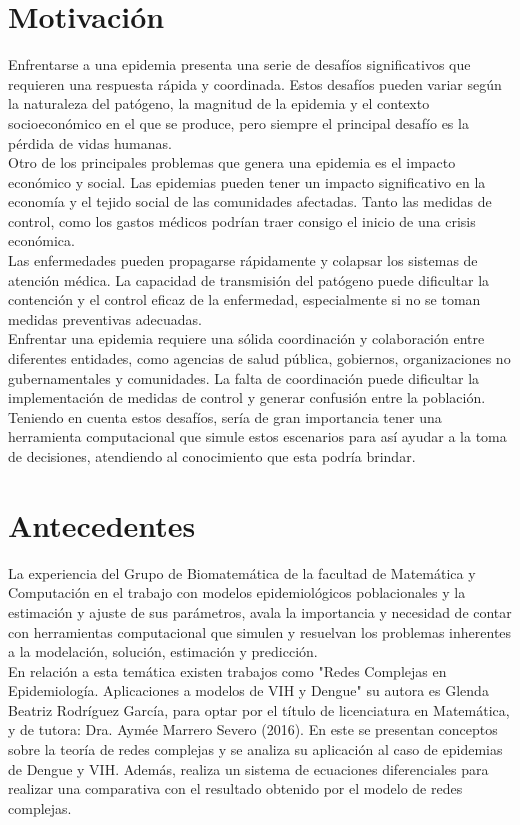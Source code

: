 \section{Motivación}
Enfrentarse a una epidemia presenta una serie de desafíos significativos que requieren 
una respuesta rápida y coordinada. Estos desafíos pueden variar según la naturaleza del 
patógeno, la magnitud de la epidemia y el contexto socioeconómico en el que se produce, 
pero siempre el principal desafío es la pérdida de vidas humanas.\\
Otro de los principales problemas que genera una epidemia es el impacto económico y social. 
Las epidemias pueden tener un impacto significativo en la economía y el tejido social 
de las comunidades afectadas. Tanto las medidas de control, como los gastos médicos podrían 
traer consigo el inicio de una crisis económica.\\
Las enfermedades pueden propagarse rápidamente y colapsar los sistemas de atención 
médica. La capacidad de transmisión del patógeno puede dificultar la contención y el control 
eficaz de la enfermedad, especialmente si no se toman medidas preventivas adecuadas.\\
Enfrentar una epidemia requiere una sólida coordinación y colaboración entre diferentes 
entidades, como agencias de salud pública, gobiernos, organizaciones no gubernamentales y 
comunidades. La falta de coordinación puede dificultar la implementación de medidas de 
control y generar confusión entre la población.\\
Teniendo en cuenta estos desafíos, sería de gran importancia tener una herramienta 
computacional que simule estos escenarios para así ayudar a la toma de decisiones, atendiendo 
al conocimiento que esta podría brindar.\\

\section{Antecedentes}
La experiencia del Grupo de Biomatemática de la facultad de Matemática y Computación en el trabajo 
con modelos epidemiológicos poblacionales y la estimación y ajuste de sus parámetros, avala la 
importancia y necesidad de contar con herramientas computacional que simulen y resuelvan los problemas 
inherentes a la modelación, solución, estimación y predicción.\\
En relación a esta temática existen trabajos como "Redes Complejas en Epidemiología. Aplicaciones a 
modelos de VIH y Dengue" su autora es Glenda Beatriz Rodríguez García, para optar por el título 
de licenciatura en Matemática, y de tutora: Dra. Aymée Marrero Severo (2016). En este se presentan
conceptos sobre la teoría de redes complejas y se analiza su aplicación al caso de epidemias de Dengue
y VIH. Además, realiza un sistema de ecuaciones diferenciales para realizar una comparativa con el 
resultado obtenido por el modelo de redes complejas.\\ 


